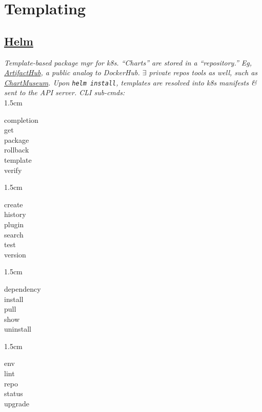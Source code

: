 \section{Templating}


\subsection*{\href{https://helm.sh/docs/helm/helm/}{Helm}}

{\footnotesize \textit{Template-based package mgr for k8s. ``Charts'' are stored in a ``repository.'' Eg, \href{https://artifacthub.io/}{ArtifactHub}, a public analog to DockerHub. $\exists$ private repos tools as well, such as \href{https://chartmuseum.com/}{ChartMuseum}. Upon {\tt helm install}, templates are resolved into k8s manifests \& sent to the API server. CLI sub-cmds:}}\\[-2mm]
\api
{1.5cm}{
completion      \\
get             \\
package         \\
rollback        \\
template        \\
verify


}
{1.5cm}{
create          \\
history         \\
plugin          \\
search          \\
test            \\
version

}
{1.5cm}{
dependency      \\
install         \\
pull            \\
show            \\
uninstall       

}
{1.5cm}{
env             \\
lint            \\
repo            \\
status          \\
upgrade         

}
\stopapi

